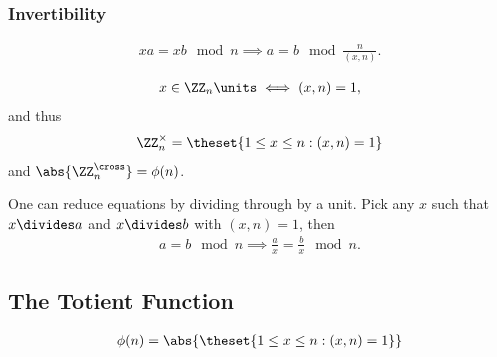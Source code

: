 \hypertarget{invertibility}{%
\subsubsection{Invertibility}\label{invertibility}}

\begin{proposition}

\begin{align*}  
xa = xb \mod n \implies a = b \mod \frac{n}{(x,n)}
.\end{align*}

\end{proposition}

\begin{proposition}

\begin{align*}  
x\in \ZZ_n\units \iff (x, n) = 1
,\end{align*} and thus
\begin{align*}
\ZZ_n^\times = \theset{1\leq x \leq n : (x,n) = 1}
\end{align*} and \(\abs{\ZZ_n^\cross} = \phi(n)\).

\end{proposition}

\begin{example}

One can reduce equations by dividing through by a unit. Pick any \(x\)
such that \(x\divides a\) and \(x\divides b\) with \((x,n) = 1\), then
\begin{align*}  
a =b \mod n \implies \frac a x = \frac b x \mod n
.\end{align*}

\end{example}

\hypertarget{the-totient-function}{%
\subsection{The Totient Function}\label{the-totient-function}}

\begin{definition}

\begin{align*}
\phi(n) = \abs{\theset{1\leq x \leq n : (x,n) = 1}}
\end{align*}

\end{definition}

